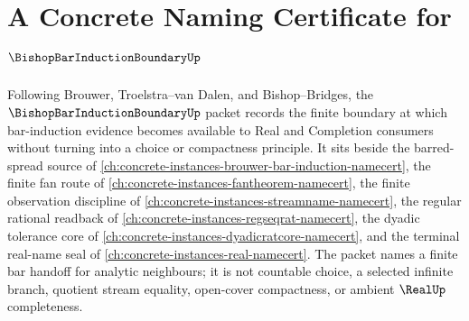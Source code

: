 \chapter{A Concrete Naming Certificate for $\BishopBarInductionBoundaryUp$}
\label{ch:concrete-instances-bishop-bar-induction-boundary-namecert}

Following Brouwer, Troelstra--van Dalen, and Bishop--Bridges, the $\BishopBarInductionBoundaryUp$ packet records the finite boundary at which bar-induction evidence becomes available to Real and Completion consumers without turning into a choice or compactness principle. It sits beside the barred-spread source of \autoref{ch:concrete-instances-brouwer-bar-induction-namecert}, the finite fan route of \autoref{ch:concrete-instances-fantheorem-namecert}, the finite observation discipline of \autoref{ch:concrete-instances-streamname-namecert}, the regular rational readback of \autoref{ch:concrete-instances-regseqrat-namecert}, the dyadic tolerance core of \autoref{ch:concrete-instances-dyadicratcore-namecert}, and the terminal real-name seal of \autoref{ch:concrete-instances-real-namecert}. The packet names a finite bar handoff for analytic neighbours; it is not countable choice, a selected infinite branch, quotient stream equality, open-cover compactness, or ambient $\RealUp$ completeness.

